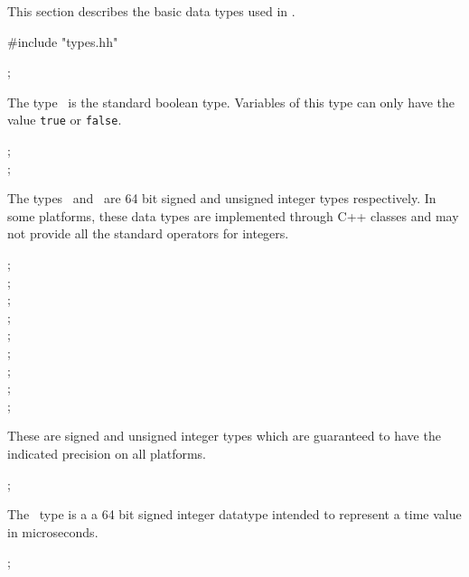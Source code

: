 This section describes the basic data types used in \rhexlib.

\begin{codesegment}
#include "types.hh"
\end{codesegment}

\begin{datatype}
\typedefcmd{\bool}; \\
\end{datatype}

The type \bool\ is the standard boolean type. Variables of this type can
only have the value {\tt true} or {\tt false}.

\begin{datatype}
\typedefcmd{\vast}; \\
\typedefcmd{\uvast}; \\
\end{datatype}

The types \vast\ and \uvast\ are 64 bit signed and unsigned integer types
respectively. In some platforms, these data types are implemented through
C++ classes and may not provide all the standard operators for integers.

\begin{datatype}
\typedefcmd{\intb}; \\
\typedefcmd{\uintb}; \\
\typedefcmd{\intw}; \\
\typedefcmd{\uintw}; \\
\typedefcmd{\intdw}; \\
\typedefcmd{\uintdw}; \\
\typedefcmd{\intqw}; \\
\typedefcmd{\uintqw}; \\
\typedefcmd{\uint}; \\
\end{datatype}

These are signed and unsigned integer types which are guaranteed to have the
indicated precision on all platforms.

\begin{datatype}
\typedefcmd{\CLOCK}; \\
\end{datatype}

The \CLOCK\ type is a a 64 bit signed integer datatype intended to represent
a time value in microseconds.

\begin{datatype}
\typedefcmd{\floats}; \\
\end{datatype}

